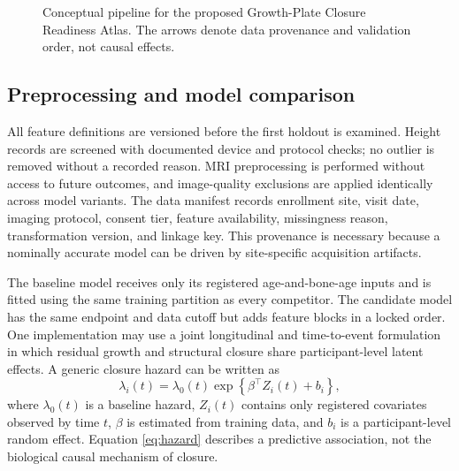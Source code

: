 \documentclass[conference]{IEEEtran}
\begin{document}
\begin{figure}[t]
\centering
{}
\caption{Conceptual pipeline for the proposed Growth-Plate Closure Readiness Atlas. The arrows denote data provenance and validation order, not causal effects.}
\label{fig:pipeline}
\end{figure}

\subsection{Preprocessing and model comparison}

All feature definitions are versioned before the first holdout is examined. Height records are screened with documented device and protocol checks; no outlier is removed without a recorded reason. MRI preprocessing is performed without access to future outcomes, and image-quality exclusions are applied identically across model variants. The data manifest records enrollment site, visit date, imaging protocol, consent tier, feature availability, missingness reason, transformation version, and linkage key. This provenance is necessary because a nominally accurate model can be driven by site-specific acquisition artifacts.

The baseline model receives only its registered age-and-bone-age inputs and is fitted using the same training partition as every competitor. The candidate model has the same endpoint and data cutoff but adds feature blocks in a locked order. One implementation may use a joint longitudinal and time-to-event formulation in which residual growth and structural closure share participant-level latent effects. A generic closure hazard can be written as
\begin{equation}
\lambda_i(t)=\lambda_0(t)\exp\left\{\beta^\top Z_i(t)+b_i\right\},
\label{eq:hazard}
\end{equation}
where $\lambda_0(t)$ is a baseline hazard, $Z_i(t)$ contains only registered covariates observed by time $t$, $\beta$ is estimated from training data, and $b_i$ is a participant-level random effect. Equation \eqref{eq:hazard} describes a predictive association, not the biological causal mechanism of closure.
\end{document}
